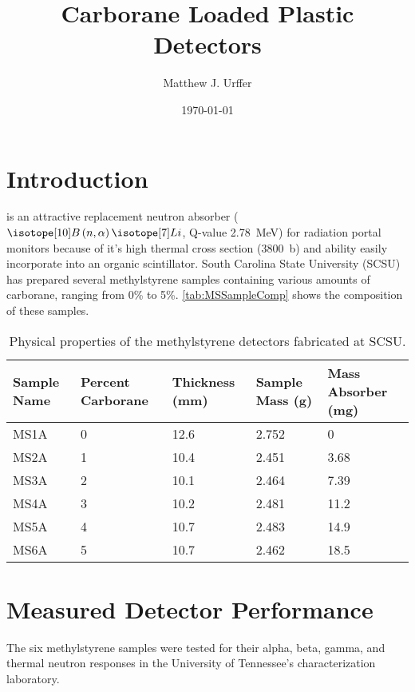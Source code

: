 \documentclass[draftcls,onecolumn]{IEEEtran}
\begin{document}
\title{Carborane Loaded Plastic Detectors}
\author{Matthew J. Urffer}
\date{\today}
\maketitle

\tableofcontents
\listoffigures
\listoftables
\section{Introduction}

 is an attractive replacement neutron absorber ($\iso[10]{B}\left( n,\alpha \right ) \iso[7]{Li}$, Q-value \SI{2.78}{\MeV}) for radiation portal monitors because of it's high thermal cross section (\SI{3800}{b}) and ability easily incorporate into an organic scintillator.
South Carolina State University (SCSU) has prepared several methylstyrene samples containing various amounts of carborane, ranging from 0\% to 5\%.
\autoref{tab:MSSampleComp} shows the composition of these samples.
\begin{table}[h]
\centering
\caption[Methylstyrene Detectors Physical Properties]{Physical properties of the methylstyrene detectors fabricated at SCSU.}
\label{tab:PhysicalProperties}
  \begin{tabular}{m{4cm}| m{2cm} m{2cm} m{2cm} m{2cm} }
  \toprule
     Sample Name & Percent Carborane &  Thickness (mm) & Sample Mass (g) & Mass Absorber (mg)\\
    \midrule
    MS1A & 0 & 12.6 & 2.752 & 0 \\
    MS2A & 1 & 10.4 & 2.451 & 3.68  \\
    MS3A & 2 & 10.1 & 2.464 & 7.39 \\
    MS4A & 3 & 10.2 & 2.481 & 11.2 \\
    MS5A & 4 & 10.7 & 2.483 & 14.9 \\
    MS6A & 5 & 10.7 & 2.462 & 18.5 \\
    \bottomrule
  \end{tabular}
\end{table}

\section{Measured Detector Performance}
The six methylstyrene samples were tested for their alpha, beta, gamma, and thermal neutron responses in the University of Tennessee's characterization laboratory.
\end{document}
